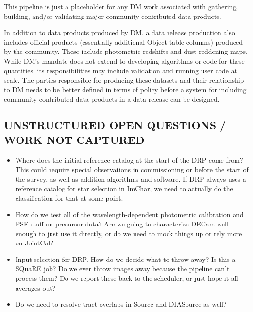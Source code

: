 This pipeline is just a placeholder for any DM work associated with gathering, building, and/or validating major community-contributed data products.

In addition to data products produced by DM, a data release production also includes official products (essentially additional Object table columns) produced by the community.  These include photometric redshifts and dust reddening maps.  While DM's mandate does not extend to developing algorithms or code for these quantities, its responsibilities may include validation and running user code at scale.  The parties responsible for producing these datasets and their relationship to DM needs to be better defined in terms of policy before a system for including community-contributed data products in a data release can be designed.

\subsection{UNSTRUCTURED OPEN QUESTIONS / WORK NOT CAPTURED}

\begin{itemize}
\item Where does the initial reference catalog at the start of the DRP come from?  This could require special observations in commissioning or before the start of the survey, as well as addition algorithms and software.  If DRP always uses a reference catalog for star selection in ImChar, we need to actually do the classification for that at some point.
\item How do we test all of the wavelength-dependent photometric calibration and PSF stuff on precursor data?  Are we going to characterize DECam well enough to just use it directly, or do we need to mock things up or rely more on JointCal?
\item Input selection for DRP.  How do we decide what to throw away?  Is this a SQuaRE job?  Do we ever throw images away because the pipeline can't process them?  Do we report these back to the scheduler, or just hope it all averages out?
\item Do we need to resolve tract overlaps in Source and DIASource as well?
\end{itemize}

